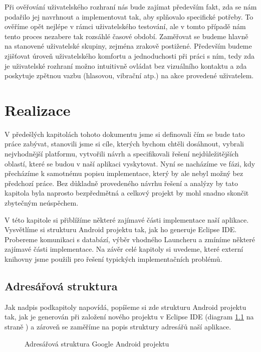\documentclass[thesis=M,czech]{FITthesis}[2012/06/26]
\begin{document}
Při ověřování uživatelského rozhraní nás bude zajímat především fakt, zda se nám podařilo jej navrhnout a implementovat tak, aby splňovalo specifické potřeby. To ověříme opět nejlépe v rámci uživatelského testování, ale v tomto případě nám tento proces nezabere tak rozsáhlé časové období. Zaměřovat se budeme hlavně na stanovené uživatelské skupiny, zejména zrakově postižené. Především budeme zjišťovat úroveň uživatelského komfortu a jednoduchosti při práci s ním, tedy zda je uživatelské rozhraní možno intuitivně ovládat bez vizuálního kontaktu a zda poskytuje zpětnou vazbu (hlasovou, vibrační atp.) na akce provedené uživatelem.

\chapter{Realizace}
V předešlých kapitolách tohoto dokumentu jsme si definovali čím se bude tato práce zabývat, stanovili jsme si cíle, kterých bychom chtěli dosáhnout, vybrali nejvhodnější platformu, vytvořili návrh a specifikovali řešení nejdůležitějších oblastí, které se budou v naší aplikaci vyskytovat. Nyní se nacházíme ve fázi, kdy přecházíme k samotnému popisu implementace, který by ale nebyl možný bez předchozí práce. Bez důkladně provedeného návrhu řešení a analýzy by tato kapitola byla naprosto bezpředmětná a celkový projekt by mohl snadno skončit zbytečným neúspěchem. 

V této kapitole si přiblížíme některé zajímavé části implementace naší aplikace. Vysvětlíme si strukturu Android projektu tak, jak ho generuje Eclipse IDE. Probereme komunikaci s databází, výběr vhodného Launcheru a zmíníme některé zajímavé části implementace. Na závěr celé kapitoly si uvedeme, které externí knihovny jsme použili pro řešení typických implementačních problémů.

\section{Adresářová struktura}
Jak nadpis podkapitoly napovídá, popíšeme si zde strukturu Android projektu \cite{android_project_structure} tak, jak je generován při založení nového projektu v Eclipse IDE (diagram \ref{fig:android_project_structure} na straně \pageref{fig:android_project_structure}) a zároveň se zaměříme na popis struktury adresářů naší aplikace.

\begin{figure}
\caption{Adresářová struktura Google Android projektu}
\label{fig:android_project_structure}
\end{figure}
\end{document}
